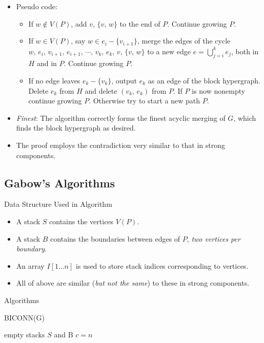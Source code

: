 \documentclass{beamer}
\begin{document}
\begin{frame}
	\begin{itemize}
		\item
		\alert{Pseudo code}:
		\begin{itemize}
			\item
			If $w\notin V(P)$, add $v,\,\{v,\,w\}$ to the end of $P$. Continue growing $P$.
			\item
			If $w\in V(P)$, say $w\in e_i-\{v_{i+1}\}$, merge the edges of the cycle $w,\,e_i,\,v_{i+1},\,e_{i+1},\,\cdots,\,v_k,\,e_k,\,v,\,\{v,\,w\}$
			to a new edge $e=\bigcup_{j=i}^ke_j$, both in $H$ and in $P$. Continue growing $P$.
			\item
			If no edge leaves $e_k-\{v_k\}$, output $e_k$ as an edge of the block hypergraph. Delete $e_k$ from $H$ and delete $(v_k,\,e_k)$
			from $P$. If $P$ is now nonempty continue growing $P$. Otherwise try to start a new path $P$.
		\end{itemize}
		\item
		\emph{Finest}: The algorithm correctly forms the finest acyclic merging of $G$, which finds the block hypergraph as desired.
		\item
		The proof employs the contradiction very similar to that in strong components.
	\end{itemize}
\end{frame}

\subsection{Gabow's Algorithms}

\begin{frame}{Data Structure Used in Algorithm}
	\begin{itemize}
		\item
		A \alert{stack $S$} contains the vertices $V(P)$.
		\item
		A \alert{stack $B$} contains the boundaries between edges of $P$, \emph{two vertices per boundary}.
		\item
		An array \alert{$I[1\ldots n]$} is used to store stack indices corresponding to vertices.
		\item
		All of above are similar (\emph{but not the same}) to these in strong components.
	\end{itemize}
\end{frame}

\begin{frame}{Algorithms}
	\SetAlFnt{\normalsize}
	\begin{procedure}[H]
		\caption{BICONN(G)}
		empty stacks $S$ and B\;
		$c=n$\;
	\end{procedure}
\end{frame}
\end{document}
